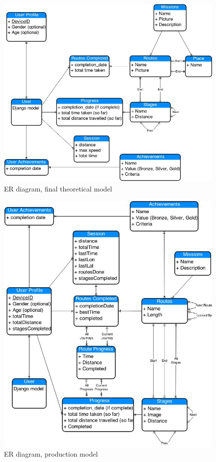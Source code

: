 \begin{figure}[p]
  \centering
  \includegraphics[width=\textwidth]{images/ER.jpg}
  \caption{ER diagram, final theoretical model}
  \label{ER_1}
\end{figure}

\begin{figure}[p]
  \centering
  \includegraphics[width=\textwidth]{images/ER_prod.jpg}
  \caption{ER diagram, production model}
  \label{ER_2}
\end{figure}

